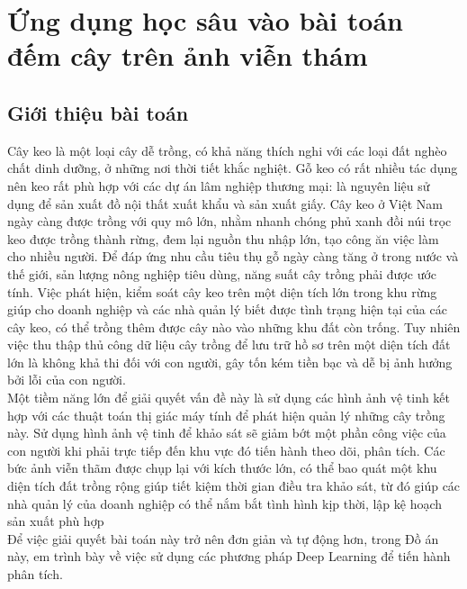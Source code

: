 \documentclass[a4paper, 12pt]{report}
\begin{document}
\chapter{Ứng dụng học sâu vào bài toán đếm cây trên ảnh viễn thám}
\section{Giới thiệu bài toán}
\hspace*{1cm} Cây keo là một loại cây dễ trồng, có khả năng thích nghi với các loại đất nghèo chất dinh dưỡng, ở những nơi thời tiết khắc nghiệt. Gỗ keo có rất nhiều tác dụng nên keo rất phù hợp với các dự án lâm nghiệp thương mại: là nguyên liệu sử dụng để sản xuất đồ nội thất xuất khẩu và sản xuất giấy. Cây keo ở Việt Nam ngày càng được trồng với quy mô lớn, nhằm nhanh chóng phủ xanh đồi núi trọc keo được trồng thành rừng, đem lại nguồn thu nhập lớn, tạo công ăn việc làm cho nhiều người. Để đáp ứng nhu cầu tiêu thụ gỗ ngày càng tăng ở trong nước và thế giới, sản lượng nông nghiệp tiêu dùng, năng suất cây trồng phải được ước tính. Việc phát hiện, kiểm soát cây keo trên một diện tích lớn trong khu rừng giúp cho doanh nghiệp và các nhà quản lý biết được tình trạng hiện tại của các cây keo, có thể trồng thêm được cây nào vào những khu đất còn trống. Tuy nhiên việc thu thập thủ công dữ liệu cây trồng để lưu trữ hồ sơ trên một diện tích đất lớn là không khả thi đối với con người, gây tốn kém tiền bạc và dễ bị ảnh hưởng bởi lỗi của con người. \\
\hspace*{1cm} Một tiềm năng lớn để giải quyết vấn đề này là sử dụng các hình ảnh vệ tinh
kết hợp với các thuật toán thị giác máy tính để phát hiện quản lý những cây trồng này. Sử dụng hình ảnh vệ tinh để khảo sát sẽ giảm bớt một phần công việc của con người khi phải trực tiếp đến khu vực đó tiến hành theo dõi, phân tích. Các bức ảnh viễn thãm được chụp lại với kích thước lớn, có thể bao quát một khu diện tích đất trồng rộng giúp tiết kiệm thời gian điều tra khảo sát, từ đó giúp các nhà quản lý của doanh nghiệp có thể nắm bắt tình hình kịp thời, lập kệ hoạch sản xuất phù hợp \\
\hspace*{1cm}Để việc giải quyết bài toán này trở nên đơn giản và tự động hơn, trong Đồ án
này, em trình bày về việc sử dụng các phương pháp Deep Learning để tiến hành phân
tích.
\end{document}
